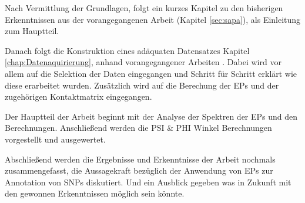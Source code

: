 Nach Vermittlung der Grundlagen, folgt ein kurzes Kapitel zu den bisherigen Erkenntnissen aus der vorangegangenen Arbeit (Kapitel \ref{sec:sapa}), als Einleitung zum Hauptteil.

Danach folgt die Konstruktion eines adäquaten Datensatzes Kapitel \ref{chap:Datenaquirierung}, anhand vorangegangener Arbeiten \cite{Mathias.2014}. Dabei wird vor allem auf die Selektion der Daten eingegangen und Schritt für Schritt erklärt wie diese erarbeitet wurden. Zusätzlich wird auf die Berechung der \ac{EP}s und der zugehörigen Kontaktmatrix eingegangen.

Der Hauptteil der Arbeit beginnt mit der Analyse der Spektren der \ac{EP}s und den Berechnungen. Anschließend werden die PSI \& PHI Winkel Berechnungen vorgestellt und ausgewertet.



Abschließend werden die Ergebnisse und Erkenntnisse der Arbeit nochmals zusammengefasst, die Aussagekraft bezüglich der Anwendung von \ac{EP}s zur Annotation von \ac{SNP}s diskutiert. Und ein Ausblick gegeben was in Zukunft mit den gewonnen Erkenntnissen möglich sein könnte.


